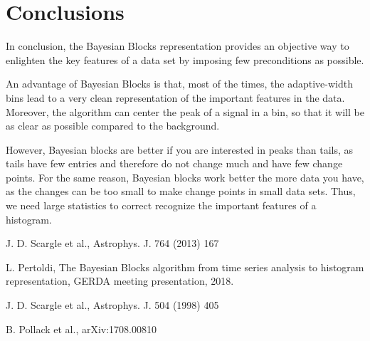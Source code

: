 \documentclass[prb,twocolumn]{revtex4-1}
\begin{document}
\section{Conclusions}

In conclusion, the Bayesian Blocks representation provides an objective way to enlighten the key features of a data set by imposing few preconditions as possible.

An advantage of Bayesian Blocks is that, most of the times, the adaptive-width bins lead to a very clean representation of the important features in the data. Moreover, the algorithm can center the peak of a signal in a bin, so that it will be as clear as possible compared to the background. 

However, Bayesian blocks are better if you are interested in peaks than tails, as tails have few entries and therefore do not change much and have few change points.
For the same reason, Bayesian blocks work better the more data you have, as the changes can be too small to make change points in small data sets. Thus, we need large statistics to correct recognize the important features of a histogram. 

\vskip 1.0cm

\begin{thebibliography}{99}

J. D. Scargle et al., Astrophys. J. 764 (2013) 167

L. Pertoldi, The Bayesian Blocks algorithm from time series analysis to histogram representation, GERDA meeting presentation, 2018.

J. D. Scargle et al., Astrophys. J. 504 (1998) 405

B. Pollack et al., arXiv:1708.00810

\end{thebibliography}
\end{document}
